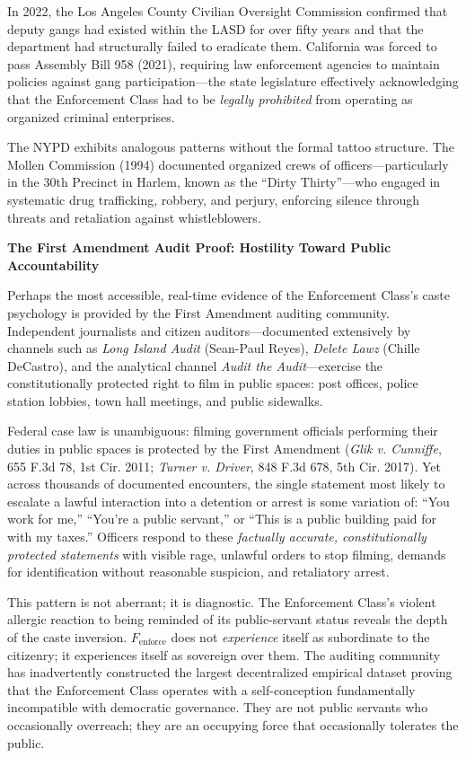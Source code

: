 \documentclass[12pt,openany]{book}
\begin{document}
In 2022, the Los Angeles County Civilian Oversight Commission confirmed that deputy gangs had existed within the LASD for over fifty years and that the department had structurally failed to eradicate them. California was forced to pass Assembly Bill 958 (2021), requiring law enforcement agencies to maintain policies against gang participation---the state legislature effectively acknowledging that the Enforcement Class had to be \textit{legally prohibited} from operating as organized criminal enterprises.

The NYPD exhibits analogous patterns without the formal tattoo structure. The Mollen Commission (1994) documented organized crews of officers---particularly in the 30th Precinct in Harlem, known as the ``Dirty Thirty''---who engaged in systematic drug trafficking, robbery, and perjury, enforcing silence through threats and retaliation against whistleblowers.

\textbf{The First Amendment Audit Proof: Hostility Toward Public Accountability}

Perhaps the most accessible, real-time evidence of the Enforcement Class's caste psychology is provided by the First Amendment auditing community. Independent journalists and citizen auditors---documented extensively by channels such as \textit{Long Island Audit} (Sean-Paul Reyes), \textit{Delete Lawz} (Chille DeCastro), and the analytical channel \textit{Audit the Audit}---exercise the constitutionally protected right to film in public spaces: post offices, police station lobbies, town hall meetings, and public sidewalks.

Federal case law is unambiguous: filming government officials performing their duties in public spaces is protected by the First Amendment (\textit{Glik v. Cunniffe}, 655 F.3d 78, 1st Cir. 2011; \textit{Turner v. Driver}, 848 F.3d 678, 5th Cir. 2017). Yet across thousands of documented encounters, the single statement most likely to escalate a lawful interaction into a detention or arrest is some variation of: ``You work for me,'' ``You're a public servant,'' or ``This is a public building paid for with my taxes.'' Officers respond to these \textit{factually accurate, constitutionally protected statements} with visible rage, unlawful orders to stop filming, demands for identification without reasonable suspicion, and retaliatory arrest.

This pattern is not aberrant; it is diagnostic. The Enforcement Class's violent allergic reaction to being reminded of its public-servant status reveals the depth of the caste inversion. $F_{\text{enforce}}$ does not \textit{experience} itself as subordinate to the citizenry; it experiences itself as sovereign over them. The auditing community has inadvertently constructed the largest decentralized empirical dataset proving that the Enforcement Class operates with a self-conception fundamentally incompatible with democratic governance. They are not public servants who occasionally overreach; they are an occupying force that occasionally tolerates the public.
\end{document}
